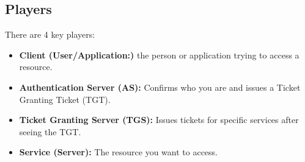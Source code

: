 \subsection{Players}
There are 4 key players:
\begin{itemize}
    \item \textbf{Client (User/Application:)} the person or application trying to access a resource.
    \item \textbf{Authentication Server (AS):} Confirms who you are and issues a Ticket Granting Ticket (TGT).
    \item \textbf{Ticket Granting Server (TGS):} Issues tickets for specific services after seeing the TGT.
    \item \textbf{Service (Server):} The resource you want to access. 
\end{itemize}

